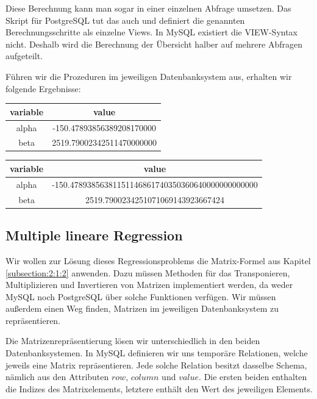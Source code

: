 Diese Berechnung kann man sogar in einer einzelnen Abfrage umsetzen. Das Skript für PostgreSQL tut das auch und definiert die genannten Berechnungsschritte als einzelne Views. In MySQL existiert die VIEW-Syntax nicht. Deshalb wird die Berechnung der Übersicht halber auf mehrere Abfragen aufgeteilt.

Führen wir die Prozeduren im jeweiligen Datenbanksystem aus, erhalten wir folgende Ergebnisse:

\begin{center}
  \begin{tabular}{|c|c|}\hline
    \textbf{variable} & \textbf{value} \\ \hline
    alpha & -150.47893856389208170000 \\ \hline
    beta & 2519.79002342511470000000 \\ \hline
  \end{tabular}

  \begin{tabular}{|c|c|}\hline
    \textbf{variable} & \textbf{value} \\ \hline
    alpha & -150.47893856381151146861740350360640000000000000 \\ \hline
    beta & 2519.7900234251071069143923667424 \\ \hline
  \end{tabular}
\end{center}

\subsection{Multiple lineare Regression}
\label{subsection:3:4:2}

Wir wollen zur Lösung dieses Regressionsproblems die Matrix-Formel aus Kapitel \ref{subsection:2:1:2} anwenden. Dazu müssen Methoden für das Transponieren, Multiplizieren und Invertieren von Matrizen implementiert werden, da weder MySQL noch PostgreSQL über solche Funktionen verfügen. Wir müssen außerdem einen Weg finden, Matrizen im jeweiligen Datenbanksystem zu repräsentieren.

Die Matrizenrepräsentierung lösen wir unterschiedlich in den beiden Datenbanksystemen. In MySQL definieren wir uns temporäre Relationen, welche jeweils eine Matrix repräsentieren. Jede solche Relation besitzt dasselbe Schema, nämlich aus den Attributen $row$, $column$ und $value$. Die ersten beiden enthalten die Indizes des Matrixelements, letztere enthält den Wert des jeweiligen Elements.

